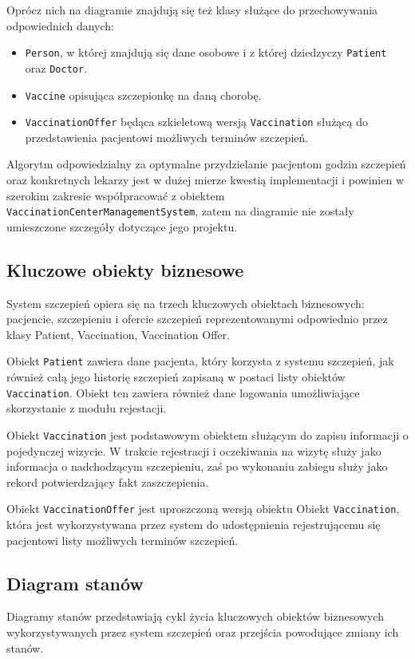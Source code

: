\documentclass[a4paper,12pt,polish]{article}
\begin{document}
Oprócz nich na diagramie znajdują się też klasy służące do przechowywania odpowiednich danych:

\begin{itemize}
    \item \texttt{Person}, w której znajdują się dane osobowe i z której dziedzyczy \texttt{Patient} oraz \texttt{Doctor}.
    \item \texttt{Vaccine} opisująca szczepionkę na daną chorobę.
    \item \texttt{VaccinationOffer} będąca szkieletową wersją \texttt{Vaccination} służącą do przedstawienia pacjentowi możliwych terminów szczepień.
\end{itemize}

Algorytm odpowiedzialny za optymalne przydzielanie pacjentom godzin szczepień oraz konkretnych lekarzy jest w dużej mierze kwestią implementacji i powinien w szerokim zakresie współpracować z obiektem \texttt{VaccinationCenterManagementSystem}, zatem na diagramie nie zostały umieszczone szczegóły dotyczące jego projektu.

\newpage

\subsection{Kluczowe obiekty biznesowe}
System szczepień opiera się na trzech kluczowych obiektach biznesowych: pacjencie, szczepieniu i ofercie szczepień reprezentowanymi odpowiednio przez klasy Patient, Vaccination, Vaccination Offer.

Obiekt \texttt{Patient} zawiera dane pacjenta, który korzysta z systemu szczepień, jak również całą jego historię szczepień zapisaną w postaci listy obiektów \texttt{Vaccination}. Obiekt ten zawiera również dane logowania umożliwiające skorzystanie z modułu rejestacji.

Obiekt \texttt{Vaccination} jest podstawowym obiektem służącym do zapisu informacji o pojedynczej wizycie. W trakcie rejestracji i oczekiwania na wizytę służy jako informacja o nadchodzącym szczepieniu, zaś po wykonaniu zabiegu służy jako rekord potwierdzający fakt zaszczepienia.

Obiekt \texttt{VaccinationOffer} jest uproszczoną wersją obiektu Obiekt \texttt{Vaccination}, która jest wykorzystywana przez system do udostępnienia rejestrującemu się pacjentowi listy możliwych terminów szczepień. 

\newpage

\subsection{Diagram stanów}
Diagramy stanów przedstawiają cykl życia kluczowych obiektów biznesowych wykorzystywanych przez system szczepień oraz przejścia powodujące zmiany ich stanów.
\end{document}
